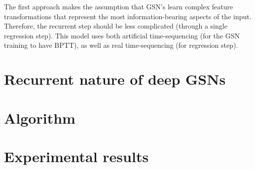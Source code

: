 The first approach makes the assumption that GSN's learn complex feature transformations that represent the most information-bearing aspects of the input. Therefore, the recurrent step should be less complicated (through a single regression step). This model uses both artificial time-sequencing (for the GSN training to have BPTT), as well as real time-sequencing (for regression step).

\section{Recurrent nature of deep GSNs}

\section{Algorithm}

\section{Experimental results}
